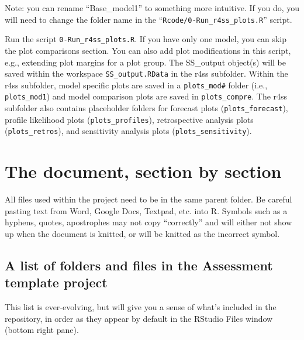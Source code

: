 \documentclass[12pt,]{article}
\begin{document}
Note: you can rename ``Base\_model1'' to something more intuitive. If
you do, you will need to change the folder name in the
``\texttt{Rcode/0-Run\_r4ss\_plots.R}'' script.

Run the script \texttt{0-Run\_r4ss\_plots.R}. If you have only one
model, you can skip the plot comparisons section. You can also add plot
modifications in this script, e.g., extending plot margins for a plot
group. The SS\_output object(s) will be saved within the workspace
\texttt{SS\_output.RData} in the r4ss subfolder. Within the r4ss
subfolder, model specific plots are saved in a \texttt{plots\_mod\#}
folder (i.e., \texttt{plots\_mod1}) and model comparison plots are saved
in \texttt{plots\_compre}. The r4ss subfolder also contains placeholder
folders for forecast plots (\texttt{plots\_forecast}), profile
likelihood plots (\texttt{plots\_profiles}), retrospective analysis
plots (\texttt{plots\_retros}), and sensitivity analysis plots
(\texttt{plots\_sensitivity}).

\section{The document, section by
section}\label{the-document-section-by-section}

All files used within the project need to be in the same parent folder.
Be careful pasting text from Word, Google Docs, Textpad, etc. into R.
Symbols such as a hyphens, quotes, apostrophes may not copy
``correctly'' and will either not show up when the document is knitted,
or will be knitted as the incorrect symbol.

\subsection{A list of folders and files in the Assessment template
project}\label{a-list-of-folders-and-files-in-the-assessment-template-project}

This list is ever-evolving, but will give you a sense of what's included
in the repository, in order as they appear by default in the RStudio
Files window (bottom right pane).
\end{document}

